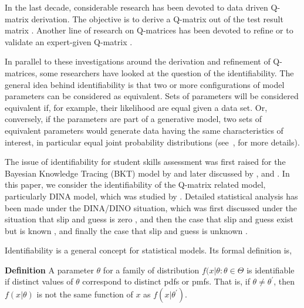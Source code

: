\documentclass{edm_template}
\begin{document}
In the last decade, considerable research has been devoted to data driven Q-matrix derivation.  The objective is to derive a Q-matrix out of the test result matrix \cite{barnes2010novel, liu2012data, desmarais2015combining, xu2016boosted}.  Another line of research on Q-matrices has been devoted to refine or to validate an expert-given Q-matrix \cite{de2015general, chiu2013statistical, desmarais2013matrix}.

In parallel to these investigations around the derivation and refinement of Q-matrices, some researchers have looked at the question of the identifiability.  The general idea behind identifiability is that two or more configurations of model parameters can be considered as equivalent.  Sets of parameters will be considered equivalent if, for example, their likelihood are equal given a data set.  Or, conversely, if the parameters are part of a generative model, two sets of equivalent parameters would generate data having the same characteristics of interest, in particular equal joint probability distributions (see~, for more details).

The issue of identifiability for student skills assessment was first raised for the Bayesian Knowledge Tracing (BKT) model by  and later discussed by , and .  In this paper, we consider the identifiability of the Q-matrix related model, particularly DINA model, which was studied by  .  Detailed statistical analysis has been made under the DINA/DINO situation, which was first discussed under the situation that slip and guess is zero \cite{chiu2009cluster}, and then the case that slip and guess exist but is known \cite{liu2013theory}, and finally the case that slip and guess is unknown \cite{chen2015statistical}. 


Identifiability is a general concept for statistical models. Its formal definition is,

\textbf{Definition} \cite{casella2002statistical} A parameter $\theta$ for a family of distribution ${f(x|\theta: \theta \in \Theta}$ is identifiable if distinct values of $\theta$ correspond to distinct pdfs or pmfs. That is, if $\theta \neq \theta^{\prime}$, then $f(x|\theta)$ is not the same function of $x$ as $f(x|\theta^{\prime})$.
\end{document}
